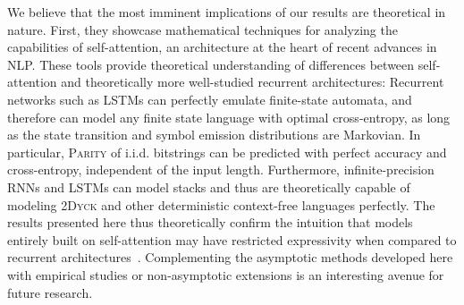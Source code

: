 \documentclass[11pt,a4paper]{article}
\begin{document}
We believe that the most imminent implications of our results are theoretical in nature.
First, they showcase mathematical techniques for analyzing the capabilities of self-attention, an architecture at the heart of recent advances in NLP.
These tools provide theoretical understanding of differences between self-attention and theoretically more well-studied recurrent architectures:
Recurrent networks such as LSTMs can perfectly emulate finite-state automata, and therefore can model any finite state language with optimal cross-entropy, as long as the state transition and symbol emission distributions are Markovian.
In particular, \textsc{Parity} of i.i.d. bitstrings can be predicted with perfect accuracy and cross-entropy, independent of the input length.
Furthermore, infinite-precision RNNs and LSTMs can model stacks \cite{tabor2000fractal,gruning2006stack,kirov2012processing} and thus are theoretically capable of modeling \textsc{2Dyck} and other deterministic context-free languages perfectly.
The results presented here thus theoretically confirm the intuition that models entirely built on self-attention may have restricted expressivity when compared to recurrent architectures~\cite{tran2018importance,dehghani2018universal,shen2018disan,chen2018best,hao2019modeling}.
Complementing the asymptotic methods developed here with empirical studies or non-asymptotic extensions is an interesting avenue for future research.
\end{document}
